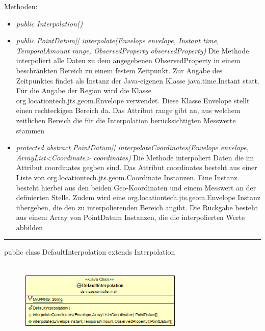 Methoden:
\begin{itemize}
    \item \emph{public Interpolation()}
    \item \emph{public PointDatum[] interpolate(Envelope envelope, Instant time, TemporalAmount range, ObservedProperty observedProperty)}
    Die Methode interpoliert alle Daten zu dem angegebenen ObservedProperty in einem beschränkten Bereich zu einem festem Zeitpunkt.
    Zur Angabe des Zeitpunktes findet als Instanz der Java-eigenen Klasse java.time.Instant statt.
    Für die Angabe der Region wird die Klasse org.locationtech.jts.geom.Envelope verwendet.
    Diese Klasse Envelope stellt einen rechteckigen Bereich da.
    Das Attribut range gibt an, aus welchem zeitlichen Bereich die für die Interpolation berücksichtigten Messwerte stammen
    \item \emph{protected abstract PointDatum[] interpolateCoordinates(Envelope envelope, ArrayList<Coordinate> coordinates)}
    Die Methode interpoliert Daten die im Attribut coordinates gegben sind.
    Das Attribut coordinates besteht aus einer Liste von org.locationtech.jts.geom.Coordinate Instanzen.
    Eine Instanz besteht hierbei aus den beiden Geo-Koordinaten und einem Messwert an der definierten Stelle.
    Zudem wird eine org.locationtech.jts.geom.Envelope Instanz übergeben, die den zu interpolierenden Bereich angibt.
    Die Rückgabe besteht aus einem Array von PointDatum Instanzen, die die interpolierten Werte abbilden
\end{itemize}
\clearpage %
\rule{\textwidth}{0.4pt}
public class DefaultInterpolation extends Interpolation
\\\\
    \begin{figure}[H]
        {\centering\includegraphics[width=0.7\textwidth]{media/backend/controller/classes/DefaultInterpolation.png}}
    \end{figure}
